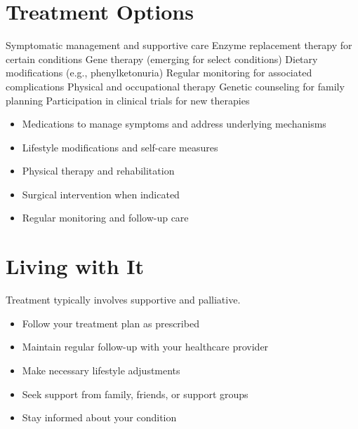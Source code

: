 \section{Treatment Options}
Symptomatic management and supportive care Enzyme replacement therapy for certain conditions Gene therapy (emerging for select conditions) Dietary modifications (e.g., phenylketonuria) Regular monitoring for associated complications Physical and occupational therapy Genetic counseling for family planning Participation in clinical trials for new therapies

\begin{itemize}[noitemsep]
  \item Medications to manage symptoms and address underlying mechanisms
  \item Lifestyle modifications and self-care measures
  \item Physical therapy and rehabilitation
  \item Surgical intervention when indicated
  \item Regular monitoring and follow-up care
\end{itemize}
\section{Living with It}
Treatment typically involves supportive and palliative.

\begin{itemize}[noitemsep]
  \item Follow your treatment plan as prescribed
  \item Maintain regular follow-up with your healthcare provider
  \item Make necessary lifestyle adjustments
  \item Seek support from family, friends, or support groups
  \item Stay informed about your condition
\end{itemize}
